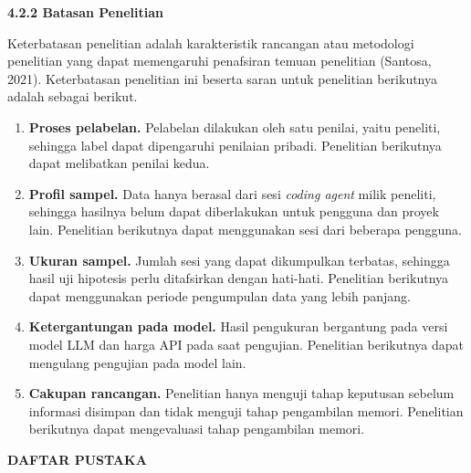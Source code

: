 \documentclass[12pt,a4paper]{article}
\newcommand{\asing}[1]{\textit{#1}}
\newcommand{\subsubbab}[2]{%
  \par\vspace{0.5em}\phantomsection\label{#2}%
  \noindent\textbf{#1}\par\nopagebreak\vspace{0.2em}}
\begin{document}
\subsubbab{4.2.2 Batasan Penelitian}{sec:4.2.2}

Keterbatasan penelitian adalah karakteristik rancangan atau metodologi penelitian yang dapat memengaruhi penafsiran temuan penelitian (Santosa, 2021). Keterbatasan penelitian ini beserta saran untuk penelitian berikutnya adalah sebagai berikut.
\begin{enumerate}[leftmargin=1.25cm]
\item \textbf{Proses pelabelan.} Pelabelan dilakukan oleh satu penilai, yaitu peneliti, sehingga label dapat dipengaruhi penilaian pribadi. Penelitian berikutnya dapat melibatkan penilai kedua.
\item \textbf{Profil sampel.} Data hanya berasal dari sesi \asing{coding agent} milik peneliti, sehingga hasilnya belum dapat diberlakukan untuk pengguna dan proyek lain. Penelitian berikutnya dapat menggunakan sesi dari beberapa pengguna.
\item \textbf{Ukuran sampel.} Jumlah sesi yang dapat dikumpulkan terbatas, sehingga hasil uji hipotesis perlu ditafsirkan dengan hati-hati. Penelitian berikutnya dapat menggunakan periode pengumpulan data yang lebih panjang.
\item \textbf{Ketergantungan pada model.} Hasil pengukuran bergantung pada versi model LLM dan harga API pada saat pengujian. Penelitian berikutnya dapat mengulang pengujian pada model lain.
\item \textbf{Cakupan rancangan.} Penelitian hanya menguji tahap keputusan sebelum informasi disimpan dan tidak menguji tahap pengambilan memori. Penelitian berikutnya dapat mengevaluasi tahap pengambilan memori.
\end{enumerate}

\clearpage
{}\label{sec:daftar-pustaka}
\begin{center}\large\bfseries DAFTAR PUSTAKA\end{center}
\vspace{0.8em}
\end{document}

